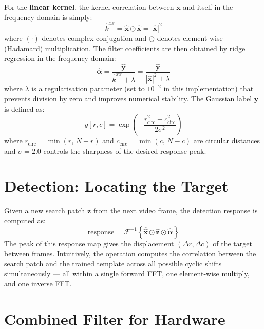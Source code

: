 \documentclass[a4paper,12pt]{report}
\begin{document}
For the \textbf{linear kernel}, the kernel correlation between $\mathbf{x}$ and itself in the frequency domain is simply:
\begin{equation}
    \hat{k}^{xx} = \overline{\hat{\mathbf{x}}} \odot \hat{\mathbf{x}} = |\hat{\mathbf{x}}|^2
    \label{eq_kernel_linear}
\end{equation}
where $\overline{(\cdot)}$ denotes complex conjugation and $\odot$ denotes element-wise (Hadamard) multiplication. The filter coefficients are then obtained by ridge regression in the frequency domain:
\begin{equation}
    \hat{\boldsymbol{\alpha}} = \frac{\hat{\mathbf{y}}}{\hat{k}^{xx} + \lambda}
    = \frac{\hat{\mathbf{y}}}{|\hat{\mathbf{x}}|^2 + \lambda}
    \label{eq_alpha}
\end{equation}
where $\lambda$ is a regularisation parameter (set to $10^{-2}$ in this implementation) that prevents division by zero and improves numerical stability. The Gaussian label $\mathbf{y}$ is defined as:
\begin{equation}
    y[r,c] = \exp\!\left(-\frac{r_{\text{circ}}^2 + c_{\text{circ}}^2}{2\sigma^2}\right)
    \label{eq_gaussian}
\end{equation}
where $r_{\text{circ}} = \min(r,\, N-r)$ and $c_{\text{circ}} = \min(c,\, N-c)$ are circular distances and $\sigma = 2.0$ controls the sharpness of the desired response peak.

\section{Detection: Locating the Target}

Given a new search patch $\mathbf{z}$ from the next video frame, the detection response is computed as:
\begin{equation}
    \text{response} = \mathcal{F}^{-1}\!\left\{\overline{\hat{\mathbf{x}}} \odot \hat{\mathbf{z}} \odot \hat{\boldsymbol{\alpha}}\right\}
    \label{eq_detect_full}
\end{equation}
The peak of this response map gives the displacement $(\Delta r, \Delta c)$ of the target between frames. Intuitively, the operation computes the correlation between the search patch and the trained template across all possible cyclic shifts simultaneously --- all within a single forward FFT, one element-wise multiply, and one inverse FFT.

\section{Combined Filter for Hardware}
\label{sec_combined}
\end{document}
